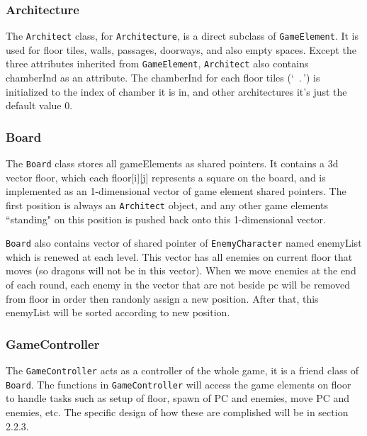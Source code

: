 \documentclass[11pt]{article}
\theoremstyle{plain} \newtheorem{theorem*}{Theorem}[subsection]
\begin{document}
\subsubsection{Architecture}

The \texttt{Architect} class, for \texttt{Architecture}, is a direct subclass 
of \texttt{GameElement}. It is used for floor tiles, walls, passages, doorways,
and also empty spaces. Except the three attributes inherited from
\texttt{GameElement}, \texttt{Architect}
also contains \textsf{chamberInd} as an attribute.
The \textsf{chamberInd} for each floor tiles (`\ .\,') is initialized to
the index of chamber it is in, and other architectures it's just the default
value $0$.


\subsubsection{Board}

The \texttt{Board} class stores all gameElements as shared pointers. 
It contains a 3d vector \textsf{floor}, which each 
\textsf{floor[i][j]} represents a square on the board, and is implemented as an
1-dimensional vector of game element shared pointers. The first position is
always an \texttt{Architect} object, 
and any other game elements ``standing" on this
position is pushed back onto this 1-dimensional vector.

\texttt{Board} also contains vector of shared pointer of 
\texttt{EnemyCharacter} named \textsf{enemyList} which is renewed at each level.
This vector has all enemies on current \textsf{floor} that moves 
(so dragons will not be in this vector).
When we move enemies at the end of each round, each enemy in the vector 
that are not beside pc will
be removed from \textsf{floor} in order then randonly assign a new position.
After that, this \textsf{enemyList} will be sorted according to new position.



\subsubsection{GameController}

The \texttt{GameController} acts as a controller of the whole game,
it is a friend class of \texttt{Board}. 
The functions in \texttt{GameController} will access
the game elements on \textsf{floor} to handle tasks such as setup of
\textsf{floor}, spawn of PC and enemies, move PC and enemies, etc.  The
specific design of how these are complished will be in section 2.2.3.
\end{document}
